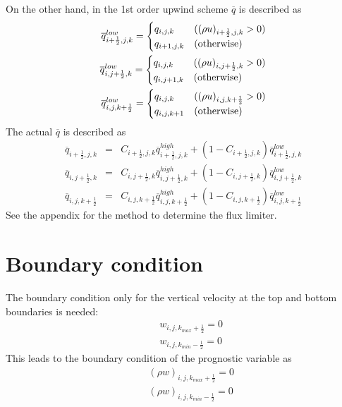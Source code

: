\begin{description}
\begin{eqnarray}
\end{eqnarray}
On the other hand, in the 1st order upwind scheme 
$\overline{q}$ is described as
\begin{eqnarray}
\overline{q}_{i+\frac{1}{2},j,k}^{low} =
\begin{cases}
  q_{i,j,k} & ( (\rho u)_{i+\frac{1}{2},j,k}>0 )\\
  q_{i+1,j,k} & ({\rm otherwise})\\
\end{cases}
\\
\overline{q}_{i,j+\frac{1}{2},k}^{low} =
\begin{cases}
  q_{i,j,k} & ( (\rho u)_{i,j+\frac{1}{2},k}>0 )\\
  q_{i,j+1,k} & ({\rm otherwise})\\
\end{cases}
\\
\overline{q}_{i,j,k+\frac{1}{2}}^{low} =
\begin{cases}
  q_{i,j,k} & ( (\rho u)_{i,j,k+\frac{1}{2}}>0 )\\
  q_{i,j,k+1} & ({\rm otherwise})\\
\end{cases}
\end{eqnarray}
The actual $\overline{q}$ is described as
\begin{eqnarray}
  \overline{q}_{i+\frac{1}{2},j,k}
&=& C_{i+\frac{1}{2},j,k} \overline{q}_{i+\frac{1}{2},j,k}^{high}
+ \left( 1 - C_{i+\frac{1}{2},j,k}\right) \overline{q}_{i+\frac{1}{2},j,k}^{low}\\
  \overline{q}_{i,j+\frac{1}{2},k}
&=& C_{i,j+\frac{1}{2},k} \overline{q}_{i,j+\frac{1}{2},k}^{high}
+ \left( 1 - C_{i,j+\frac{1}{2},k}\right) \overline{q}_{i,j+\frac{1}{2},k}^{low}\\
  \overline{q}_{i,j,k+\frac{1}{2}}
&=& C_{i,j,k+\frac{1}{2}} \overline{q}_{i,j,k+\frac{1}{2}}^{high}
+ \left( 1 - C_{i,j,k+\frac{1}{2}}\right) \overline{q}_{i,j,k+\frac{1}{2}}^{low}
\end{eqnarray}
See the appendix for the method to determine the flux limiter.
\end{description}



\section{Boundary condition}
The boundary condition only for the vertical velocity at the top and bottom
boundaries is needed:
\begin{eqnarray}
&&  w_{i,j,k_{max}+\frac{1}{2}} = 0\\
&&  w_{i,j,k_{min}-\frac{1}{2}} = 0
\end{eqnarray}
This leads to the boundary condition of the prognostic variable as
\begin{eqnarray}
&&  (\rho w)_{i,j,k_{max}+\frac{1}{2}} = 0\\
&&  (\rho w)_{i,j,k_{min}-\frac{1}{2}} = 0
\end{eqnarray}



